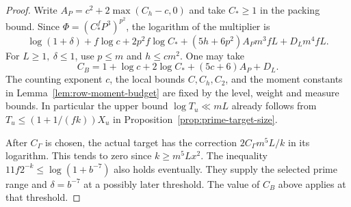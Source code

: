 \begin{proof}
Write \(A_P=c^2+2\max(C_h-c,0)\) and take \(C_*\ge1\) in the
packing bound. Since \(\Phi=(C_*^fP^3)^{p^2}\), the logarithm
of the multiplier is
\[
 \log(1+\delta)+f\log c+2p^2f\log C_*
 +(5h+6p^2)A_Pm^3fL+D_Lm^4fL .
\]
For \(L\ge1,\ \delta\le1\), use \(p\le m\) and \(h\le cm^2\).
One may take
\[
 C_B=1+\log c+2\log C_*+(5c+6)A_P+D_L .
\]
The counting exponent \(c\), the local bounds \(C,C_h,C_2\), and
the moment constants in Lemma~\ref{lem:row-moment-budget} are
fixed by the level, weight and measure bounds. In particular the
upper bound \(\log T_u\ll mL\) already follows from
\(T_u\le(1+1/(fk))X_u\) in Proposition~\ref{prop:prime-target-size}.

After \(C_\Gamma\) is chosen, the actual target has the correction
\(2C_\Gamma m^5L/k\) in its logarithm. This tends to zero since
\(k\ge m^5Lx^2\). The inequality \(11f2^{-k}\le\log(1+b^{-7})\)
also holds eventually. They supply the selected prime range and
\(\delta=b^{-7}\) at a possibly later threshold. The value of
\(C_B\) above applies at that threshold.
\end{proof}

